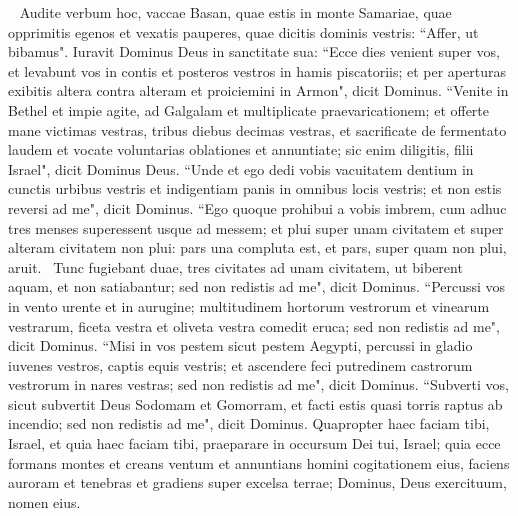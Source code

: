 \begin{biblechapter}   
\verse Audite verbum hoc, vaccae Basan, quae estis in monte Samariae, quae opprimitis egenos et vexatis pauperes, quae dicitis dominis vestris: “Affer, ut bibamus". 
\verse Iuravit Dominus Deus in sanctitate sua: “Ecce dies venient super vos, et levabunt vos in contis et posteros vestros in hamis piscatoriis; 
\verse et per aperturas exibitis altera contra alteram et proiciemini in Armon", dicit Dominus. 
\verse “Venite in Bethel et impie agite, ad Galgalam et multiplicate praevaricationem; et offerte mane victimas vestras, tribus diebus decimas vestras, 
\verse et sacrificate de fermentato laudem et vocate voluntarias oblationes et annuntiate; sic enim diligitis, filii Israel", dicit Dominus Deus. 
\verse “Unde et ego dedi vobis vacuitatem dentium in cunctis urbibus vestris et indigentiam panis in omnibus locis vestris; et non estis reversi ad me", dicit Dominus. 
\verse “Ego quoque prohibui a vobis imbrem, cum adhuc tres menses superessent usque ad messem; et plui super unam civitatem et super alteram civitatem non plui: pars una compluta est, et pars, super quam non plui, aruit.  
\verse Tunc fugiebant duae, tres civitates ad unam civitatem, ut biberent aquam, et non satiabantur; sed non redistis ad me", dicit Dominus. 
\verse “Percussi vos in vento urente et in aurugine; multitudinem hortorum vestrorum et vinearum vestrarum, ficeta vestra et oliveta vestra comedit eruca; sed non redistis ad me", dicit Dominus. 
\verse “Misi in vos pestem sicut pestem Aegypti, percussi in gladio iuvenes vestros, captis equis vestris; et ascendere feci putredinem castrorum vestrorum in nares vestras; sed non redistis ad me", dicit Dominus. 
\verse “Subverti vos, sicut subvertit Deus Sodomam et Gomorram, et facti estis quasi torris raptus ab incendio; sed non redistis ad me", dicit Dominus. 
\verse Quapropter haec faciam tibi, Israel, et quia haec faciam tibi, praeparare in occursum Dei tui, Israel; 
\verse quia ecce formans montes et creans ventum et annuntians homini cogitationem eius, faciens auroram et tenebras et gradiens super excelsa terrae; Dominus, Deus exercituum, nomen eius. 
\end{biblechapter}

